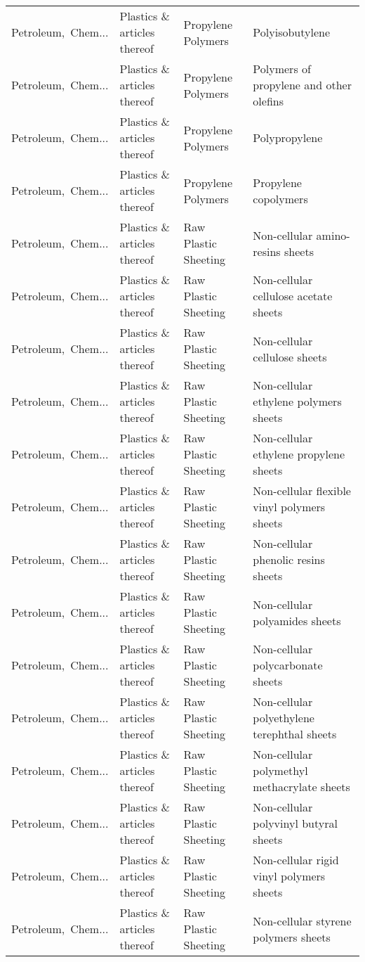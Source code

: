 \begin{appendices}
\begin{xltabular}{\textwidth}{|p{0.10\textwidth}|p{0.25\textwidth}|p{0.24\textwidth}|p{0.31\textwidth}|}
Petroleum,\ Chem... & Plastics \& articles thereof & Propylene Polymers & Polyisobutylene \\
Petroleum,\ Chem... & Plastics \& articles thereof & Propylene Polymers & Polymers of propylene and other olefins \\
Petroleum,\ Chem... & Plastics \& articles thereof & Propylene Polymers & Polypropylene \\
Petroleum,\ Chem... & Plastics \& articles thereof & Propylene Polymers & Propylene copolymers \\
Petroleum,\ Chem... & Plastics \& articles thereof & Raw Plastic Sheeting & Non-cellular amino-resins sheets \\
Petroleum,\ Chem... & Plastics \& articles thereof & Raw Plastic Sheeting & Non-cellular cellulose acetate sheets \\
Petroleum,\ Chem... & Plastics \& articles thereof & Raw Plastic Sheeting & Non-cellular cellulose sheets \\
Petroleum,\ Chem... & Plastics \& articles thereof & Raw Plastic Sheeting & Non-cellular ethylene polymers sheets \\
Petroleum,\ Chem... & Plastics \& articles thereof & Raw Plastic Sheeting & Non-cellular ethylene propylene sheets \\
Petroleum,\ Chem... & Plastics \& articles thereof & Raw Plastic Sheeting & Non-cellular flexible vinyl polymers sheets \\
Petroleum,\ Chem... & Plastics \& articles thereof & Raw Plastic Sheeting & Non-cellular phenolic resins sheets \\
Petroleum,\ Chem... & Plastics \& articles thereof & Raw Plastic Sheeting & Non-cellular polyamides sheets \\
Petroleum,\ Chem... & Plastics \& articles thereof & Raw Plastic Sheeting & Non-cellular polycarbonate sheets \\
Petroleum,\ Chem... & Plastics \& articles thereof & Raw Plastic Sheeting & Non-cellular polyethylene terephthal sheets \\
Petroleum,\ Chem... & Plastics \& articles thereof & Raw Plastic Sheeting & Non-cellular polymethyl methacrylate sheets \\
Petroleum,\ Chem... & Plastics \& articles thereof & Raw Plastic Sheeting & Non-cellular polyvinyl butyral sheets \\
Petroleum,\ Chem... & Plastics \& articles thereof & Raw Plastic Sheeting & Non-cellular rigid vinyl polymers sheets \\
Petroleum,\ Chem... & Plastics \& articles thereof & Raw Plastic Sheeting & Non-cellular styrene polymers sheets \\

\end{xltabular}
\end{appendices}
